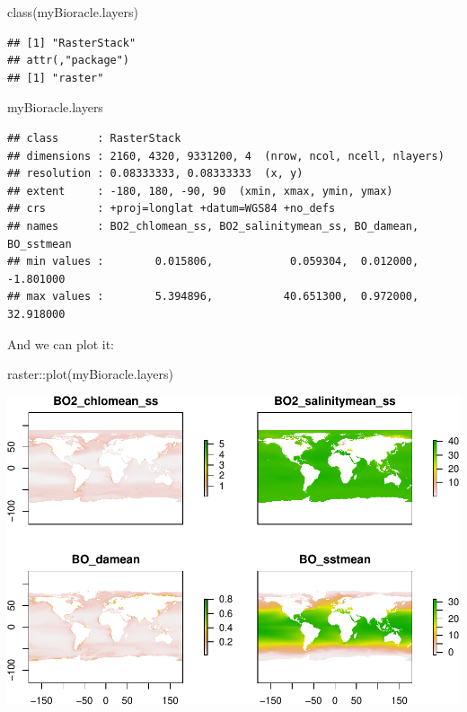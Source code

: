 \documentclass[
]{book}
\newenvironment{Shaded}{\begin{snugshade}}{\end{snugshade}}
\newcommand{\FunctionTok}[1]{\textcolor[rgb]{0.00,0.00,0.00}{#1}}
\newcommand{\NormalTok}[1]{#1}
\newcommand{\SpecialCharTok}[1]{\textcolor[rgb]{0.00,0.00,0.00}{#1}}
\begin{document}
\begin{Shaded}
\begin{Highlighting}[]
\FunctionTok{class}\NormalTok{(myBioracle.layers)}
\end{Highlighting}
\end{Shaded}

\begin{verbatim}
## [1] "RasterStack"
## attr(,"package")
## [1] "raster"
\end{verbatim}

\begin{Shaded}
\begin{Highlighting}[]
\NormalTok{myBioracle.layers}
\end{Highlighting}
\end{Shaded}

\begin{verbatim}
## class      : RasterStack 
## dimensions : 2160, 4320, 9331200, 4  (nrow, ncol, ncell, nlayers)
## resolution : 0.08333333, 0.08333333  (x, y)
## extent     : -180, 180, -90, 90  (xmin, xmax, ymin, ymax)
## crs        : +proj=longlat +datum=WGS84 +no_defs 
## names      : BO2_chlomean_ss, BO2_salinitymean_ss, BO_damean, BO_sstmean 
## min values :        0.015806,            0.059304,  0.012000,  -1.801000 
## max values :        5.394896,           40.651300,  0.972000,  32.918000
\end{verbatim}

And we can plot it:

\begin{Shaded}
\begin{Highlighting}[]
\NormalTok{raster}\SpecialCharTok{::}\FunctionTok{plot}\NormalTok{(myBioracle.layers)}
\end{Highlighting}
\end{Shaded}

\includegraphics{_main_files/figure-latex/unnamed-chunk-34-1.pdf}
\end{document}
